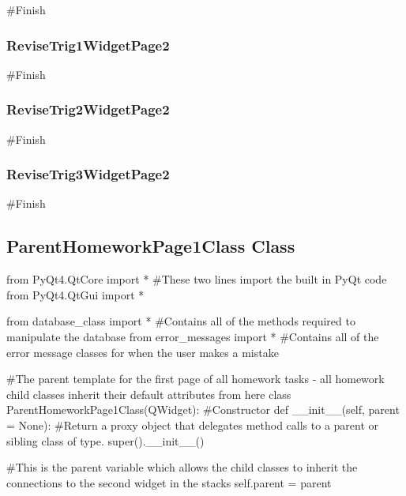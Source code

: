 \begin{landscape}
\begin{python}
#Finish
\end{python}

\subsubsection{ReviseTrig1WidgetPage2}

\begin{python}
#Finish
\end{python}

\subsubsection{ReviseTrig2WidgetPage2}

\begin{python}
#Finish
\end{python}

\subsubsection{ReviseTrig3WidgetPage2}

\begin{python}
#Finish
\end{python}

\subsection{ParentHomeworkPage1Class Class}

\begin{python}
from PyQt4.QtCore import * #These two lines import the built in PyQt code
from PyQt4.QtGui import *

from database_class import * #Contains all of the methods required to manipulate the database
from error_messages import * #Contains all of the error message classes for when the user makes a mistake

#The parent template for the first page of all homework tasks - all homework child classes inherit their default attributes from here
class ParentHomeworkPage1Class(QWidget):
    #Constructor
    def __init__(self, parent = None):
        #Return a proxy object that delegates method calls to a parent or sibling class of type.
        super().__init__()

        #This is the parent variable which allows the child classes to inherit the connections to the second widget in the stacks
        self.parent = parent
        

\end{python}
\end{landscape}
